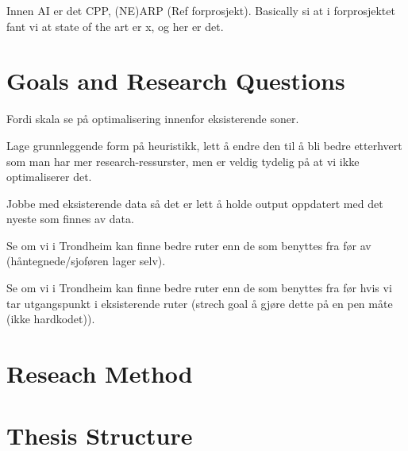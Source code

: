 Innen AI er det CPP, (NE)ARP (Ref forprosjekt). Basically si at i forprosjektet fant vi at state of the art er x, og her er det.

\section{Goals and Research Questions}

Fordi skala se på optimalisering innenfor eksisterende soner.

Lage grunnleggende form på heuristikk, lett å endre den til å bli bedre etterhvert som man har mer research-ressurster, men er veldig tydelig på at vi ikke optimaliserer det.

Jobbe med eksisterende data så det er lett å holde output oppdatert med det nyeste som finnes av data.

Se om vi i Trondheim kan finne bedre ruter enn de som benyttes fra før av (håntegnede/sjoføren lager selv).

Se om vi i Trondheim kan finne bedre ruter enn de som benyttes fra før hvis vi tar utgangspunkt i eksisterende ruter (strech goal å gjøre dette på en pen måte (ikke hardkodet)).

\section{Reseach Method}

\section{Thesis Structure}



\cleardoublepage
